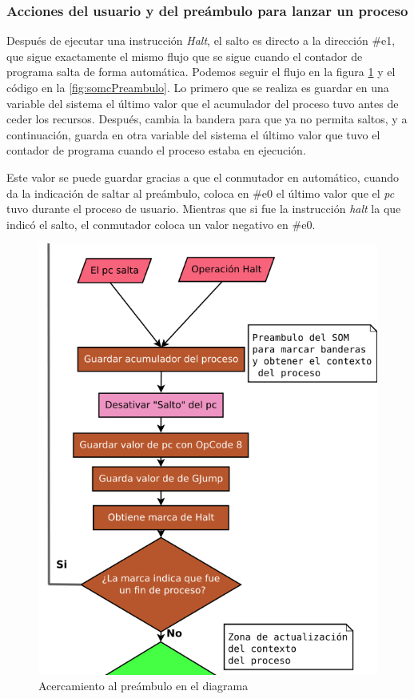 \documentclass[letterpaper,12pt,oneside]{book}
\begin{document}
		\subsubsection{Acciones del usuario y del preámbulo para lanzar un proceso}
  
		Después de ejecutar una instrucción \textit{Halt}, el salto es directo a la
		dirección \#e1, que sigue exactamente el mismo flujo que se sigue cuando el contador de programa salta de forma automática.
		Podemos seguir el flujo en la figura \ref{fig:diagZoomPreambulo} y el código en la \ref{fig:somcPreambulo}. Lo primero
		que se realiza es guardar en una variable del sistema el último valor que el acumulador del proceso tuvo antes de ceder los recursos. Después, 
		cambia la bandera 
		para que 
		ya no permita 
		saltos, y a continuación, guarda en otra variable del sistema el último valor que tuvo el contador de programa cuando
		el proceso estaba en ejecución. 
		
		Este valor se
		puede guardar
		gracias a que el conmutador en automático, cuando da la indicación de saltar al preámbulo, coloca en \#e0 el último valor que el \textit{pc}
		tuvo 
		durante el proceso de usuario. Mientras que si fue la instrucción
		\textit{halt} la que indicó el salto, el conmutador coloca un valor negativo en \#e0.

			
        \begin{figure}[h]		
			\centering
			\includegraphics[scale=0.4]{media/CARDIACC/diagPreambulo.png}
			\caption{Acercamiento al preámbulo en el diagrama}
			\label{fig:diagZoomPreambulo}
		\end{figure}
  
\end{document}
